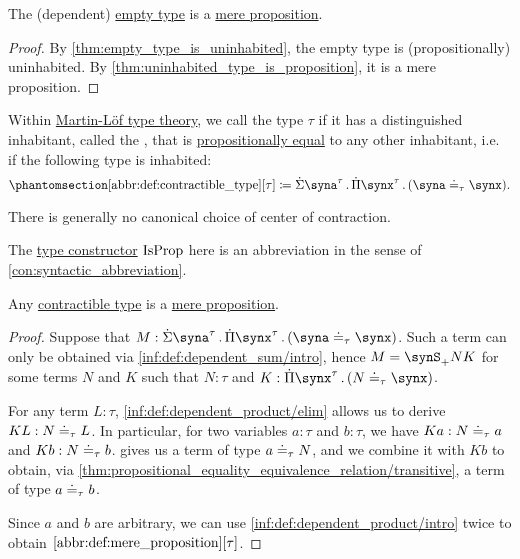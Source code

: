 \begin{corollary}\label{thm:empty_type_is_proposition}
  The (dependent) \hyperref[def:dependent_empty_type]{empty type} is a \hyperref[def:mere_proposition]{mere proposition}.
\end{corollary}
\begin{proof}
  By \cref{thm:empty_type_is_uninhabited}, the empty type is (propositionally) uninhabited. By \cref{thm:uninhabited_type_is_proposition}, it is a mere proposition.
\end{proof}

\begin{definition}\label{def:contractible_type}
  Within \hyperref[def:mltt]{Martin-L\"of type theory}, we call the type \( \tau \)  if it has a distinguished inhabitant, called the , that is \hyperref[def:mltt_propositional_equality]{propositionally equal} to any other inhabitant, i.e. if the following type is inhabited:
  \begin{equation*}\taglabel[\op{IsContr}]{abbr:def:contractible_type}
    \ref{abbr:def:contractible_type}[\tau] \coloneqq \qsum {\syna^\tau} \qprod {\synx^\tau} (\syna \syneq_\tau \synx).
  \end{equation*}
\end{definition}
\begin{comments}
  \item There is generally no canonical choice of center of contraction.

  \item The \hyperref[con:type_constructor]{type constructor} \( \op{IsProp} \) here is an abbreviation in the sense of \cref{con:syntactic_abbreviation}.
\end{comments}

\begin{proposition}\label{thm:contractible_type_is_proposition}
  Any \hyperref[def:contractible_type]{contractible type} is a \hyperref[def:mere_proposition]{mere proposition}.
\end{proposition}
\begin{proof}
  Suppose that \( M: \qsum {\syna^\tau} \qprod {\synx^\tau} (\syna \syneq_\tau \synx) \). Such a term can only be obtained via \ref{inf:def:dependent_sum/intro}, hence \( M = \synS_+ N K \) for some terms \( N \) and \( K \) such that \( N: \tau \) and \( K: \qprod {\synx^\tau} (N \syneq_\tau \synx) \).

  For any term \( L: \tau \), \ref{inf:def:dependent_product/elim} allows us to derive \( KL: N \doteq_\tau L \). In particular, for two variables \( a: \tau \) and \( b: \tau \), we have \( Ka: N \doteq_\tau a \) and \( Kb: N \doteq_\tau b \).  gives us a term of type \( a \doteq_\tau N \), and we combine it with \( Kb \) to obtain, via \cref{thm:propositional_equality_equivalence_relation/transitive}, a term of type \( a \doteq_\tau b \).

  Since \( a \) and \( b \) are arbitrary, we can use \ref{inf:def:dependent_product/intro} twice to obtain \( \ref{abbr:def:mere_proposition}[\tau] \).
\end{proof}

